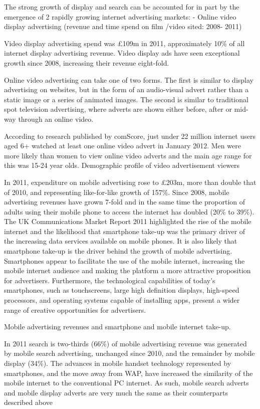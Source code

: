 \documentclass[letterpaper,10pt,openany,oneside,english]{sphinxmanual}
\begin{document}
The strong growth of display and search can be accounted for in part by the emergence of 2
rapidly growing internet advertising markets:
- Online video display advertising (revenue and time spend on film /video sited: 2008-
2011)

Video display advertising spend was £109m in 2011, approximately 10\% of all internet display
advertising revenue. Video display ads have seen exceptional growth since 2008, increasing
their revenue eight-fold.

Online video advertising can take one of two forms. The first is similar to display advertising on
websites, but in the form of an audio-visual advert rather than a static image or a series of
animated images. The second is similar to traditional spot television advertising, where adverts
are shown either before, after or mid-way through an online video.

According to research published by comScore, just under 22 million internet users aged 6+
watched at least one online video advert in January 2012. Men were more likely than women to
view online video adverts and the main age range for this was 15-24 year olds.
Demographic profile of video advertisement viewers

In 2011, expenditure on mobile advertising rose to £203m, more than double that of 2010, and
representing like-for-like growth of 157\%. Since 2008, mobile advertising revenues have grown
7-fold and in the same time the proportion of adults using their mobile phone to access the
internet has doubled (20\% to 39\%).
The UK Communications Market Report 2011 highlighted the rise of the mobile internet and the
likelihood that smartphone take-up was the primary driver of the increasing data services
available on mobile phones.
It is also likely that smartphone take-up is the driver behind the growth of mobile advertising.
Smartphones appear to facilitate the use of the mobile internet, increasing the mobile internet
audience and making the platform a more attractive proposition for advertisers.
Furthermore, the technological capabilities of today’s smartphones, such as touchscreens, large
high definition displays, high-speed processors, and operating systems capable of installing
apps, present a wider range of creative opportunities for advertisers.

Mobile advertising revenues and smartphone and mobile internet take-up.

In 2011 search is two-thirds (66\%) of mobile advertising revenue was generated by mobile
search advertising, unchanged since 2010, and the remainder by mobile display (34\%). The
advances in mobile handset technology represented by smartphones, and the move away from
WAP, have increased the similarity of the mobile internet to the conventional PC internet. As
such, mobile search adverts and mobile display adverts are very much the same as their
counterparts described above
\end{document}
